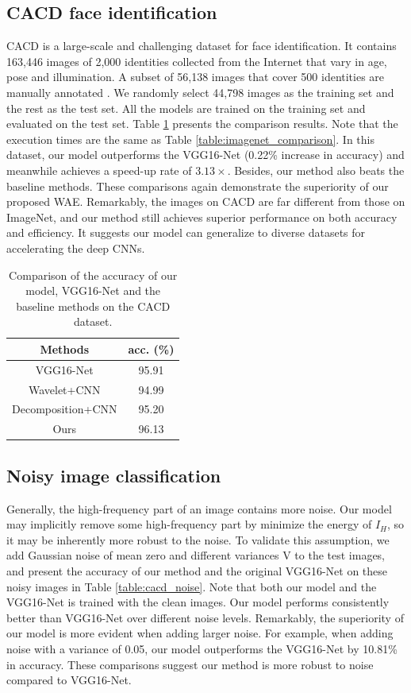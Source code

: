\documentclass[letterpaper]{article} %
\begin{document}
\subsection{CACD face identification}
CACD is a large-scale and challenging dataset for face identification. It contains 163,446 images of 2,000 identities collected from the Internet that vary in age, pose and illumination. A subset of 56,138 images that cover 500 identities are manually annotated \cite{lin2017active}. We randomly select 44,798 images as the training set and the rest as the test set. All the models are trained on the training set and evaluated on the test set. Table \ref{table:cacd_comparison} presents the comparison results. Note that the execution times are the same as Table \ref{table:imagenet_comparison}. In this dataset, our model outperforms the VGG16-Net (0.22\% increase in accuracy) and meanwhile achieves a speed-up rate of $3.13\times$. Besides, our method also beats the baseline methods. These comparisons again demonstrate the superiority of our proposed WAE. Remarkably, the images on CACD are far different from those on ImageNet, and our method still achieves superior performance on both accuracy and efficiency. It suggests our model can generalize to diverse datasets for accelerating the deep CNNs.


\begin{table}[htbp]
\centering
\begin{tabular}{c|c}
\hline
\centering  Methods  & acc. (\%) \\
\hline
\hline
VGG16-Net    & 95.91   \\
Wavelet+CNN      &   94.99  \\
Decomposition+CNN      &   95.20 \\
Ours   & 96.13   \\
\hline
\end{tabular}
\caption{Comparison of the accuracy of our model, VGG16-Net and the baseline methods on the CACD dataset.}
\label{table:cacd_comparison}
\end{table}


\vspace{-0.73mm}
\subsection{Noisy image classification}
Generally, the high-frequency part of an image contains more noise. Our model may implicitly remove some high-frequency part by minimize the energy of $I_H$, so it may be inherently more robust to the noise. To validate this assumption, we add Gaussian noise of mean zero and different variances V to the test images, and present the accuracy of our method and the original VGG16-Net on these noisy images in Table \ref{table:cacd_noise}. Note that both our model and the VGG16-Net is trained with the clean images. Our model performs consistently better than VGG16-Net over different noise levels. Remarkably, the superiority of our model is more evident when adding larger noise. For example, when adding noise with a variance of 0.05, our model outperforms the VGG16-Net by 10.81\% in accuracy. These comparisons suggest our method is more robust to noise compared to VGG16-Net.
\end{document}

